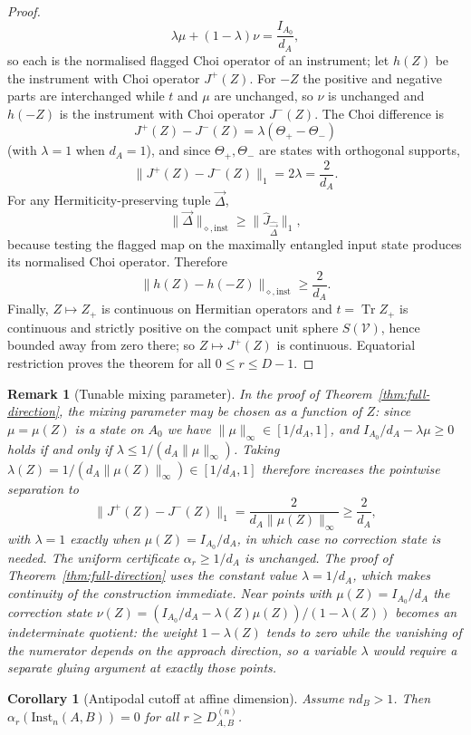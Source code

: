 \documentclass[11pt,a4paper]{article}
\newtheorem{corollary}[theorem]{Corollary}
\newtheorem{remark}[theorem]{Remark}
\newcommand{\Inst}{\mathrm{Inst}}
\newcommand{\Tr}{\operatorname{Tr}}
\newcommand{\Jhat}{\widehat J}
\newcommand{\vD}{\vec{\Delta}}
\begin{document}
\begin{proof}
\[
\lambda\mu+(1-\lambda)\nu=\frac{I_{A_0}}{d_A},
\]
so each is the normalised flagged Choi operator of an instrument; let $h(Z)$ be the instrument with Choi operator $J^+(Z)$. For $-Z$ the positive and negative parts are interchanged while $t$ and $\mu$ are unchanged, so $\nu$ is unchanged and $h(-Z)$ is the instrument with Choi operator $J^-(Z)$. The Choi difference is
\[
J^+(Z)-J^-(Z)=\lambda(\Theta_+-\Theta_-)
\]
(with $\lambda=1$ when $d_A=1$), and since $\Theta_+,\Theta_-$ are states with orthogonal supports,
\[
\|J^+(Z)-J^-(Z)\|_1=2\lambda=\frac2{d_A}.
\]
For any Hermiticity-preserving tuple $\vD$,
\[
\|\vD\|_{\diamond,\mathrm{inst}}\ge\|\Jhat_{\widehat{\vD}}\|_1,
\]
because testing the flagged map on the maximally entangled input state produces its normalised Choi operator. Therefore
\[
\|h(Z)-h(-Z)\|_{\diamond,\mathrm{inst}}\ge\frac2{d_A}.
\]
Finally, $Z\mapsto Z_+$ is continuous on Hermitian operators and $t=\Tr Z_+$ is continuous and strictly positive on the compact unit sphere $S(\mathcal V)$, hence bounded away from zero there; so $Z\mapsto J^+(Z)$ is continuous. Equatorial restriction proves the theorem for all $0\le r\le D-1$.
\end{proof}

\begin{remark}[Tunable mixing parameter]
\label{rem:tunable-lambda}
In the proof of Theorem~\ref{thm:full-direction}, the mixing parameter may be chosen as a function of $Z$: since $\mu=\mu(Z)$ is a state on $A_0$ we have $\|\mu\|_\infty\in[1/d_A,1]$, and $I_{A_0}/d_A-\lambda\mu\ge0$ holds if and only if $\lambda\le1/(d_A\|\mu\|_\infty)$. Taking $\lambda(Z)=1/(d_A\|\mu(Z)\|_\infty)\in[1/d_A,1]$ therefore increases the pointwise separation to
\[
\|J^+(Z)-J^-(Z)\|_1=\frac{2}{d_A\|\mu(Z)\|_\infty}\ge\frac2{d_A},
\]
with $\lambda=1$ exactly when $\mu(Z)=I_{A_0}/d_A$, in which case no correction state is needed. The uniform certificate $\alpha_r\ge1/d_A$ is unchanged. The proof of Theorem~\ref{thm:full-direction} uses the constant value $\lambda=1/d_A$, which makes continuity of the construction immediate. Near points with $\mu(Z)=I_{A_0}/d_A$ the correction state $\nu(Z)=(I_{A_0}/d_A-\lambda(Z)\mu(Z))/(1-\lambda(Z))$ becomes an indeterminate quotient: the weight $1-\lambda(Z)$ tends to zero while the vanishing of the numerator depends on the approach direction, so a variable $\lambda$ would require a separate gluing argument at exactly those points.
\end{remark}

\begin{corollary}[Antipodal cutoff at affine dimension]
\label{cor:cutoff}
Assume $nd_B>1$. Then $\alpha_r(\Inst_n(A,B))=0$ for all $r\ge D_{A,B}^{(n)}$.
\end{corollary}
\end{document}
